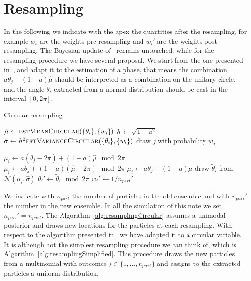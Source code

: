\documentclass[aps, pra, 10pt, twocolumn, superscriptaddress,floatfix]{revtex4-1}
\begin{document}
\section{Resampling}
%
In the following we indicate with the apex the quantities after the resampling, for example $w_i$ are the weights pre-resampling and $w_i'$ are the weights post-resampling. The Bayesian update of~\cite{Granade2012} remains untouched, while for the resampling procedure we have several proposal. We start from the one presented in~\cite{Granade2012}, and adapt it to the estimation of a phase, that means the combination $a \theta_j + (1-a) \hat{\mu}$ should be interpreted as a combination on the unitary circle, and the angle $\tilde{\theta}_i$ extracted from a normal distribution should be cast in the interval $[0, 2 \pi]$.
%
\begin{algorithm}[H]
	\caption{Circular resampling}
	\label{alg:resamplingCircular}
	\begin{algorithmic}[1]
		\State $\hat{\mu} \gets \Call{estMeanCircular}{\lbrace \theta_i \rbrace, \lbrace w_i \rbrace}$
		\State $h \gets \sqrt{1-a^2}$
		\State $\hat{\sigma} \gets h^2 \Call{estVarianceCircular}{\lbrace \theta_i \rbrace, \lbrace w_i \rbrace}$
		\State draw $j$ with probability $w_j$
		
		\State $\mu_i \gets a (\theta_j - 2 \pi) + (1-a) \hat{\mu} \mod 2 \pi$
		\State $\mu_i \gets a \theta_j + (1-a) (\hat{\mu} - 2 \pi) \mod 2 \pi$
		\Else 
		\State $\mu_i \gets a \theta_j + (1-a) \hat{\mu}$
		\EndIf		
		\State draw $\tilde{\theta}_i$ from $\mathcal{N} \left( \mu_i, \hat{\sigma} \right)$
		\State $\theta_i' \gets \tilde{\theta}_i \mod 2 \pi$
		\State $w_i' \gets 1/n_{part}'$
		\EndFor
		\EndFunction
	\end{algorithmic}
\end{algorithm}
%
We indicate with $n_{part}$ the number of particles in the old ensemble and with $n_{part}'$ the number in the new ensemble. In all the simulation of this note we set $n_{part}' = n_{part}$. The Algorithm~\ref{alg:resamplingCircular} assumes a unimodal posterior and draws new locations for the particles at each resampling. With respect to the algorithm presented in~\cite{Granade2012} we have adapted it to a circular variable. It is although not the simplest resampling procedure we can think of, which is Algorithm~\ref{alg:resamplingSimplified}. This procedure draws the new particles from a multinomial with outcomes $j \in \lbrace1, \dots, n_{part} \rbrace$ and assigns to the extracted particles a uniform distribution.
\end{document}
